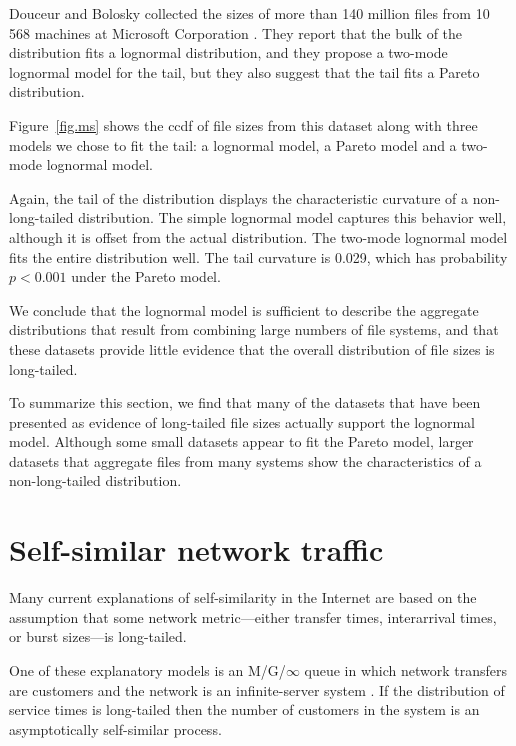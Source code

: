 \documentclass{elsart}
\begin{document}
Douceur and Bolosky collected the sizes of more than 140 million files
from 10 568 machines at Microsoft Corporation
\cite{DouceurBolosky99}.  They report that the bulk of the
distribution fits a lognormal distribution, and they propose a
two-mode lognormal model for the tail, but they also suggest that the
tail fits a Pareto distribution.

Figure~\ref{fig.ms} shows the ccdf
of file sizes from this dataset along with three models we chose to
fit the tail: a lognormal model, a Pareto model and a two-mode
lognormal model.

Again, the tail of the distribution displays the characteristic
curvature of a non-long-tailed distribution.  The simple lognormal
model captures this behavior well, although it is offset from the
actual distribution.  The two-mode lognormal model fits the entire
distribution well.  The tail curvature is 0.029, which has probability
$p < 0.001$ under the Pareto model.

We conclude that the lognormal model is sufficient to describe the
aggregate distributions that result from combining large numbers of
file systems, and that these datasets provide little evidence that the
overall distribution of file sizes is long-tailed.

To summarize this section, we find that many of the datasets that
have been presented as evidence of long-tailed file sizes actually
support the lognormal model.  Although some small datasets appear
to fit the Pareto model, larger datasets that aggregate files from
many systems show the characteristics of a non-long-tailed
distribution.



\section{Self-similar network traffic}
\label{self-sim}

Many current explanations of self-similarity in the Internet are based
on the assumption that some network metric---either transfer times,
interarrival times, or burst sizes---is long-tailed.

One of these explanatory models is an M/G/$\infty$ queue in which
network transfers are customers and the network
is an infinite-server system \cite{PaxsonFloyd95}
\cite{ParulekarMakowski96}.  If the distribution of
service times is long-tailed then the number of customers in the
system is an asymptotically self-similar process.
\end{document}
